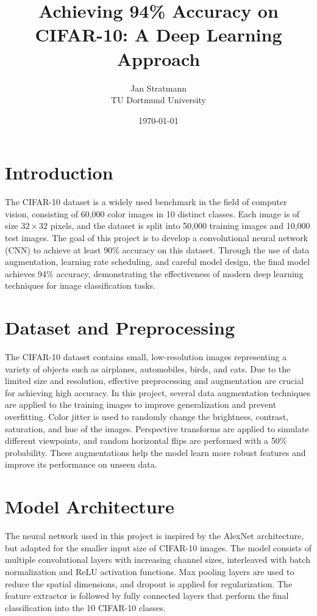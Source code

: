 \documentclass[12pt,a4paper]{article}
\title{Achieving 94\% Accuracy on CIFAR-10: A Deep Learning Approach}
\author{Jan Stratmann \\ TU Dortmund University}
\date{\today}
\begin{document}
\maketitle

\section{Introduction}
The CIFAR-10 dataset is a widely used benchmark in the field of computer vision, consisting of 60,000 color images in 10 distinct classes\cite{krizhevsky2009}. Each image is of size $32 \times 32$ pixels, and the dataset is split into 50,000 training images and 10,000 test images. The goal of this project is to develop a convolutional neural network (CNN) to achieve at least 90\% accuracy on this dataset. Through the use of data augmentation, learning rate scheduling, and careful model design, the final model achieves 94\% accuracy, demonstrating the effectiveness of modern deep learning techniques for image classification tasks.

\section{Dataset and Preprocessing}
The CIFAR-10 dataset contains small, low-resolution images representing a variety of objects such as airplanes, automobiles, birds, and cats. Due to the limited size and resolution, effective preprocessing and augmentation are crucial for achieving high accuracy. In this project, several data augmentation techniques are applied to the training images to improve generalization and prevent overfitting. Color jitter is used to randomly change the brightness, contrast, saturation, and hue of the images. Perspective transforms are applied to simulate different viewpoints, and random horizontal flips are performed with a 50\% probability. These augmentations help the model learn more robust features and improve its performance on unseen data.

\section{Model Architecture}
The neural network used in this project is inspired by the AlexNet architecture\cite{krizhevsky2012imagenet}, but adapted for the smaller input size of CIFAR-10 images. The model consists of multiple convolutional layers with increasing channel sizes, interleaved with batch normalization and ReLU activation functions. Max pooling layers are used to reduce the spatial dimensions, and dropout is applied for regularization. The feature extractor is followed by fully connected layers that perform the final classification into the 10 CIFAR-10 classes.
\end{document}
